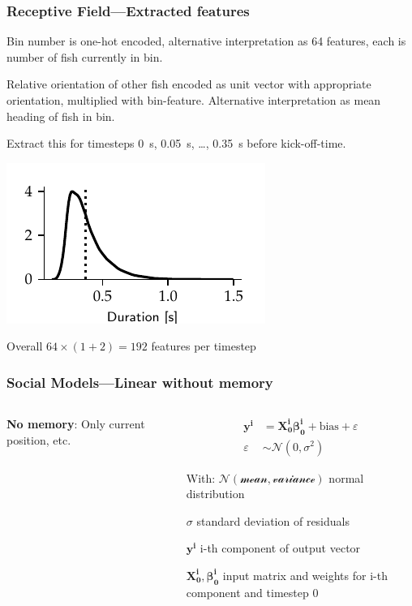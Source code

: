 \documentclass{beamer}
\begin{document}
\begin{frame}
  \frametitle{Receptive Field---Extracted features}
  Bin number is one-hot encoded, alternative interpretation as 64 features, each is number of fish currently in bin.

  Relative orientation of other fish encoded as unit vector with appropriate orientation, multiplied with bin-feature.
  Alternative interpretation as mean heading of fish in bin.

  Extract this for timesteps \SI{0}{\s}, \SI{0.05}{s}, \ldots, \SI{0.35}{\s} before kick-off-time.

  \includegraphics{kick_duration_beamer}

  Overall $64 \times (1 + 2) = 192$ features per timestep
\end{frame}

\begin{frame}
  \frametitle{Social Models---Linear without memory}
  \begin{columns}
   \begin{column}{0.5\textwidth}

 \textbf{No memory}: Only current position, etc.
\end{column}~\begin{column}{0.5\textwidth}
\begin{align*}
  \bm{y^i}  &= \bm{X^i_0} \bm{\beta^i_0} + \text{bias} + \varepsilon \\
  \varepsilon &\sim \mathcal{N}\left(0, \sigma^2 \right)
\end{align*}

With:
$\mathcal{N(\text{mean}, \text{variance})}$ normal distribution

$\sigma$ standard deviation of residuals

$\bm{y^i}$ i-th component of output vector

$\bm{X_0^i}, \bm{\beta^i_0}$ input matrix and weights for i-th component and timestep 0
\end{column}
 \end{columns}
  
\end{frame}
\end{document}
